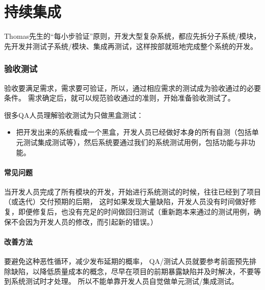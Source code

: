 \chapter{持续集成} %

Thomas先生的“每小步验证”原则，开发大型复杂系统，都应先拆分子系统/模块，先开发并测试子系统/模块、集成再测试，这样按部就班地完成整个系统的开发。

\hypertarget{ux9a8cux6536ux6d4bux8bd5}{%
\subsection{验收测试}\label{ux9a8cux6536ux6d4bux8bd5}}

验收要满足需求，需求要可验证，所以，通过相应需求的测试成为验收通过的必要条件。
需求确定后，就可以规范验收通过的准则，开始准备验收测试了。

很多QA人员理解验收测试为只做黑盒测试：

\begin{itemize}
\tightlist
\item
  把开发出来的系统看成一个黑盒，开发人员已经做好本身的所有自测（包括单元测试集成测试等），然后系统要通过我们的系统测试用例，包括功能与非功能。
\end{itemize}

\hypertarget{ux5e38ux89c1ux95eeux9898}{%
\subsubsection{常见问题}\label{ux5e38ux89c1ux95eeux9898}}

当开发人员完成了所有模块的开发，开始进行系统测试的时候，往往已经到了项目（或迭代）交付预期的后期， 这时如果发现大量缺陷，开发人员没有时间做好修复，即便修复后，也没有充足的时间做回归测试（重新跑本来通过的测试用例，确保不会因为开发人员的修改，而引起新的错误。）

\hypertarget{ux6539ux5584ux65b9ux6cd5}{%
\subsubsection{改善方法}\label{ux6539ux5584ux65b9ux6cd5}}

要避免这种恶性循环，减少发布延期的概率，
QA/测试人员就要参考前面预先排除缺陷，以降低质量成本的概念，尽早在项目的前期暴露缺陷并及时解决，不要等到系统测试时才处理。
所以不能单靠开发人员自觉做单元测试/集成测试。


